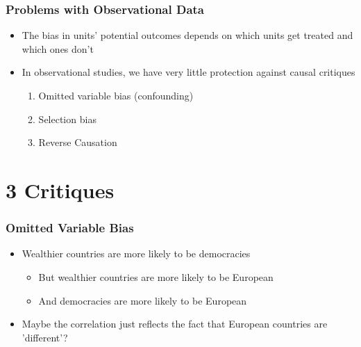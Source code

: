\documentclass[xcolor=x11names,compress]{beamer}\usepackage[]{graphicx}\usepackage[]{color}
\renewcommand{\(}{\begin{columns}}
\renewcommand{\)}{\end{columns}}
\newcommand{\<}[1]{\begin{column}{#1}}
\renewcommand{\>}{\end{column}}
\begin{document}
\begin{frame}
\frametitle{Problems with Observational Data}
\begin{itemize}
\item The bias in units' potential outcomes depends on which units get treated and which ones don't
\pause
\item In observational studies, we have very little protection against causal critiques
\pause
\begin{enumerate}
\item Omitted variable bias (confounding)
\item Selection bias
\item Reverse Causation
\end{enumerate}
\end{itemize}
\end{frame}

\section{3 Critiques}

\begin{frame}
\frametitle{Omitted Variable Bias}
\begin{itemize}
\item Wealthier countries are more likely to be democracies
\pause
\begin{itemize}
\item But wealthier countries are more likely to be European
\pause
\item And democracies are more likely to be European
\pause
\end{itemize}
\item Maybe the correlation just reflects the fact that European countries are 'different'?
\end{itemize}
\end{frame}
\end{document}
